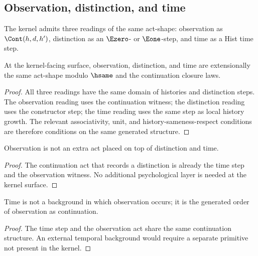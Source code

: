 \subsection{Observation, distinction, and time}
\label{subsec:philosophy-observation-distinction-time}

\begin{definition}
\label{def:philosophy-three-act-shapes}
The kernel admits three readings of the same act-shape: observation as
\(\Cont(h,d,h')\), distinction as an \(\Ezero\)- or \(\Eone\)-step,
and time as a Hist time step.
\end{definition}

\begin{theorem}
\label{thm:philosophy-observation-distinction-time-identity}
At the kernel-facing surface, observation, distinction, and time are
extensionally the same act-shape modulo \(\hsame\) and the continuation
closure laws.
\end{theorem}
\begin{proof}
All three readings have the same domain of histories and distinction
steps. The observation reading uses the continuation witness; the
distinction reading uses the constructor step; the time reading uses
the same step as local history growth. The relevant associativity, unit,
and history-sameness-respect conditions are therefore conditions on the
same generated structure.
\end{proof}

\begin{corollary}
\label{cor:philosophy-observation-not-added-after-distinction}
Observation is not an extra act placed on top of distinction and time.
\end{corollary}
\begin{proof}
The continuation act that records a distinction is already the time step
and the observation witness. No additional psychological layer is
needed at the kernel surface.
\end{proof}

\begin{corollary}
\label{cor:philosophy-time-not-outside-observation}
Time is not a background in which observation occurs; it is the
generated order of observation as continuation.
\end{corollary}
\begin{proof}
The time step and the observation act share the same continuation
structure. An external temporal background would require a separate
primitive not present in the kernel.
\end{proof}

